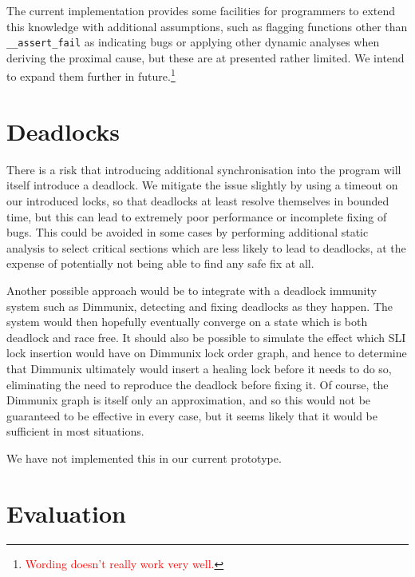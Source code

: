 \documentclass[10pt,twocolumn,preprint,natbib,authoryear]{sigplanconf}
\newcommand{\editorial}[1]{\textcolor{red}{\footnote{\textcolor{red}{#1}}}}
\begin{document}
The current implementation provides some facilities for programmers to
extend this knowledge with additional assumptions, such as flagging
functions other than \verb|__assert_fail| as indicating bugs or
applying other dynamic analyses when deriving the proximal cause, but
these are at presented rather limited.  We intend to expand them
further in future.\editorial{Wording doesn't really work very well.}

\section{Deadlocks}
\label{sect:deadlocks}

There is a risk that introducing additional synchronisation into the
program will itself introduce a deadlock.  We mitigate the issue
slightly by using a timeout on our introduced locks, so that deadlocks
at least resolve themselves in bounded time, but this can lead to
extremely poor performance or incomplete fixing of bugs.  This could
be avoided in some cases by performing additional static analysis to
select critical sections which are less likely to lead to deadlocks,
at the expense of potentially not being able to find any safe fix at
all.

Another possible approach would be to integrate with a deadlock
immunity system such as Dimmunix\cite{Jula2008}, detecting and fixing
deadlocks as they happen.  The system would then hopefully eventually
converge on a state which is both deadlock and race free.  It should
also be possible to simulate the effect which SLI lock insertion would
have on Dimmunix lock order graph, and hence to determine that
Dimmunix ultimately would insert a healing lock before it needs to do
so, eliminating the need to reproduce the deadlock before fixing it.
Of course, the Dimmunix graph is itself only an approximation, and so
this would not be guaranteed to be effective in every case, but it
seems likely that it would be sufficient in most situations.

We have not implemented this in our current prototype.

\section{Evaluation}
\label{sect:evaluation}
\end{document}
